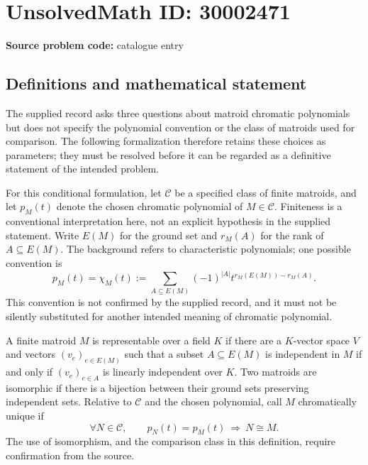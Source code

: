 \documentclass[11pt]{article}
\begin{document}
\section*{UnsolvedMath ID: 30002471}
\textbf{Source problem code:} catalogue entry
\subsection{Definitions and mathematical statement}
The supplied record asks three questions about matroid chromatic polynomials but does not specify the polynomial convention or the class of matroids used for comparison. The following formalization therefore retains these choices as parameters; they must be resolved before it can be regarded as a definitive statement of the intended problem.

For this conditional formulation, let \(\mathcal{C}\) be a specified class of finite matroids, and let \(p_M(t)\) denote the chosen chromatic polynomial of \(M\in\mathcal{C}\). Finiteness is a conventional interpretation here, not an explicit hypothesis in the supplied statement. Write \(E(M)\) for the ground set and \(r_M(A)\) for the rank of \(A\subseteq E(M)\). The background refers to characteristic polynomials; one possible convention is
\[
 p_M(t)=\chi_M(t):=\sum_{A\subseteq E(M)}(-1)^{|A|}t^{r_M(E(M))-r_M(A)}.
\]
This convention is not confirmed by the supplied record, and it must not be silently substituted for another intended meaning of chromatic polynomial.

A finite matroid \(M\) is representable over a field \(K\) if there are a \(K\)-vector space \(V\) and vectors \((v_e)_{e\in E(M)}\) such that a subset \(A\subseteq E(M)\) is independent in \(M\) if and only if \((v_e)_{e\in A}\) is linearly independent over \(K\). Two matroids are isomorphic if there is a bijection between their ground sets preserving independent sets. Relative to \(\mathcal{C}\) and the chosen polynomial, call \(M\) chromatically unique if
\[
 \forall N\in\mathcal{C},\qquad p_N(t)=p_M(t)\ \Longrightarrow\ N\cong M.
\]
The use of isomorphism, and the comparison class in this definition, require confirmation from the source.
\end{document}
